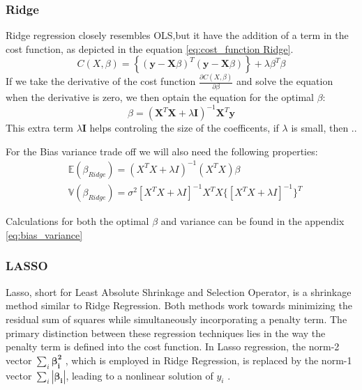 \subsubsection{Ridge}
\noindent Ridge regression closely resembles OLS,but it have the addition of a term in the 
cost function, as depicted in the equation \ref{eq:cost_function Ridge}.
\begin{equation}\label{eq:cost_function Ridge}
    C(X,\beta) =  \left\lbrace ( \textbf{y} - \textbf{X}\beta )^T (\textbf{y} - \textbf{X}\beta)\right\rbrace + \lambda \beta^T \beta
\end{equation}
If we take the derivative of the cost function $\frac{\partial C(X, \beta)}{\partial \beta}$ and 
solve the equation when the derivative is zero, we then optain the equation for the optimal $\beta$:
\begin{equation}\label{eq:beta_ridge}
    \beta = (\textbf{X}^T \textbf{X} + \lambda \textbf{I})^{-1}\textbf{X}^T \textbf{y} 
\end{equation}
This extra term $\lambda \textbf{I}$ helps controling the size of the coefficents, if $\lambda$ is 
small, then ..

For the Bias variance trade off we will also need the following properties:
\begin{align}
    & \mathbb{E}(\beta_{Ridge}) = (X^T X + \lambda I )^{-1}(X^T X)\beta\\
    & \mathbb{V}(\beta_{Ridge}) = \sigma^2[X^T X + \lambda I]^{-1} X^T X \{[X^T X + \lambda I]^{-1}\}^T
\end{align}

Calculations for both the optimal $\beta$ and variance can be found in the appendix \ref{eq:bias_variance}

\subsubsection{LASSO}

\noindent Lasso, short for Least Absolute Shrinkage and Selection Operator, is a shrinkage method similar to Ridge Regression. Both
methods work towards minimizing the residual sum of squares while simultaneously incorporating a penalty term. The primary distinction
between these regression techniques lies in the way the penalty term is defined into the cost function.
\noindent In Lasso regression, the norm-2 vector $\sum_{i} \boldsymbol{\beta_i^2}$ , which is employed in Ridge Regression, is replaced by
the norm-1 vector $\sum_{i} 
|\boldsymbol{\beta_i}|$, leading to a nonlinear solution of $y_i$ \cite{SpringerCh3}.

